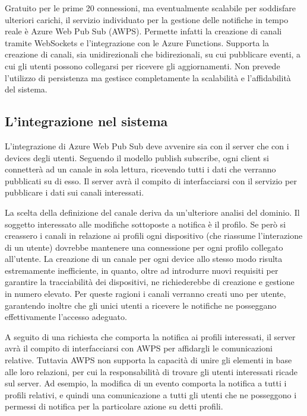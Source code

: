 Gratuito per le prime 20 connessioni, ma eventualmente scalabile per soddisfare ulteriori carichi, il servizio individuato per la gestione delle notifiche in tempo reale è Azure Web Pub Sub (AWPS). Permette infatti la creazione di canali tramite WebSockets e l’integrazione con le Azure Functions. Supporta la creazione di canali, sia unidirezionali che bidirezionali, su cui pubblicare eventi, a cui gli utenti possono collegarsi per ricevere gli aggiornamenti. Non prevede l’utilizzo di persistenza ma gestisce completamente la scalabilità e l’affidabilità del sistema.



\subsection{L'integrazione nel sistema}

L’integrazione di Azure Web Pub Sub deve avvenire sia con il server che con i devices degli utenti. Seguendo il modello publish subscribe, ogni client si connetterà ad un canale in sola lettura, ricevendo tutti i dati che verranno pubblicati su di esso. Il server avrà il compito di interfacciarsi con il servizio per pubblicare i dati sui canali interessati.

La scelta della definizione del canale deriva da un’ulteriore analisi del dominio. 
Il soggetto interessato alle modifiche sottoposte a notifica è il profilo. 
Se però si creassero i canali in relazione ai profili ogni dispositivo (che riassume l’interazione di un utente) dovrebbe mantenere una connessione per ogni profilo collegato all’utente. La creazione di un canale per ogni device allo stesso modo risulta estremamente inefficiente, in quanto, oltre ad introdurre nuovi requisiti per garantire la tracciabilità dei dispositivi, ne richiederebbe di creazione e gestione in numero elevato. Per queste ragioni i canali verranno creati uno per utente, garantendo inoltre che gli unici utenti a ricevere le notifiche ne posseggano effettivamente l’accesso adeguato.

A seguito di una richiesta che comporta la notifica ai profili interessati, il server avrà il compito di interfacciarsi con AWPS per affidargli le comunicazioni relative. Tuttavia AWPS non supporta la capacità di unire gli elementi in base alle loro relazioni, per cui la responsabilità di trovare gli utenti interessati ricade sul server. 
Ad esempio, la modifica di un evento comporta la notifica a tutti i profili relativi, e quindi una comunicazione a tutti gli utenti che ne posseggono i permessi di notifica per la particolare azione su detti profili. 

